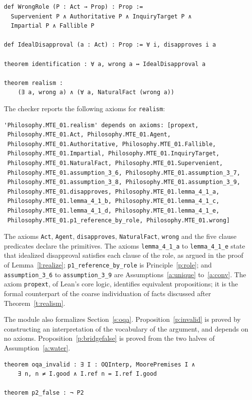 \documentclass{situationist-preprint}
\begin{document}
\begin{lstlisting}
def WrongRole (P : Act → Prop) : Prop :=
  Supervenient P ∧ Authoritative P ∧ InquiryTarget P ∧
  Impartial P ∧ Fallible P

def IdealDisapproval (a : Act) : Prop := ∀ i, disapproves i a

theorem identification : ∀ a, wrong a ↔ IdealDisapproval a

theorem realism :
    (∃ a, wrong a) ∧ (∀ a, NaturalFact (wrong a))
\end{lstlisting}

The checker reports the following axioms for \texttt{realism}:

\begin{lstlisting}
'Philosophy.MTE_01.realism' depends on axioms: [propext,
 Philosophy.MTE_01.Act, Philosophy.MTE_01.Agent,
 Philosophy.MTE_01.Authoritative, Philosophy.MTE_01.Fallible,
 Philosophy.MTE_01.Impartial, Philosophy.MTE_01.InquiryTarget,
 Philosophy.MTE_01.NaturalFact, Philosophy.MTE_01.Supervenient,
 Philosophy.MTE_01.assumption_3_6, Philosophy.MTE_01.assumption_3_7,
 Philosophy.MTE_01.assumption_3_8, Philosophy.MTE_01.assumption_3_9,
 Philosophy.MTE_01.disapproves, Philosophy.MTE_01.lemma_4_1_a,
 Philosophy.MTE_01.lemma_4_1_b, Philosophy.MTE_01.lemma_4_1_c,
 Philosophy.MTE_01.lemma_4_1_d, Philosophy.MTE_01.lemma_4_1_e,
 Philosophy.MTE_01.p1_reference_by_role, Philosophy.MTE_01.wrong]
\end{lstlisting}

The axioms \texttt{Act}, \texttt{Agent}, \texttt{disapproves}, \texttt{NaturalFact}, \texttt{wrong} and the five clause predicates declare the primitives. The axioms \texttt{lemma\_4\_1\_a} to \texttt{lemma\_4\_1\_e} state that idealized disapproval satisfies each clause of the role, as argued in the proof of Lemma~\ref{l:realize}; \texttt{p1\_reference\_by\_role} is Principle~\ref{p:role}; and \texttt{assumption\_3\_6} to \texttt{assumption\_3\_9} are Assumptions~\ref{a:unique} to~\ref{a:conv}. The axiom \texttt{propext}, of Lean's core logic, identifies equivalent propositions; it is the formal counterpart of the coarse individuation of facts discussed after Theorem~\ref{t:realism}.

The module also formalizes Section~\ref{s:oqa}. Proposition~\ref{p:invalid} is proved by constructing an interpretation of the vocabulary of the argument, and depends on no axioms. Proposition~\ref{p:bridgefalse} is proved from the two halves of Assumption~\ref{a:water}.

\begin{lstlisting}
theorem oqa_invalid : ∃ I : OQInterp, MoorePremises I ∧
    ∃ n, n ≠ I.good ∧ I.ref n = I.ref I.good

theorem p2_false : ¬ P2
\end{lstlisting}
\end{document}
